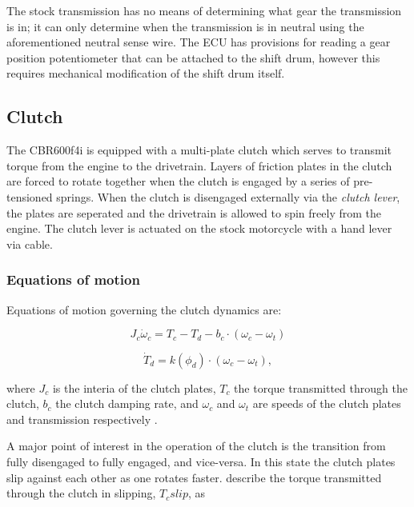 The stock transmission has no means of determining what gear the transmission is in; it can only determine when the transmission is in neutral using the aforementioned neutral sense wire. The ECU has provisions for reading a gear position potentiometer that can be attached to the shift drum, however this requires mechanical modification of the shift drum itself.

\subsection{Clutch}

The CBR600f4i is equipped with a multi-plate clutch which serves to transmit torque from the engine to the drivetrain. Layers of friction plates in the clutch are forced to rotate together when the clutch is engaged by a series of pre-tensioned springs. When the clutch is disengaged externally via the \emph{clutch lever}, the plates are seperated and the drivetrain is allowed to spin freely from the engine. The clutch lever is actuated on the stock motorcycle with a hand lever via cable.

\subsubsection{Equations of motion}

Equations of motion governing the clutch dynamics are:

\begin{equation}\label{eq:clutch_dynamics_a}
  J_c\dot{\omega}_c=T_c-T_d-b_c\cdot\left(\omega_c-\omega_t\right)
\end{equation}

\begin{equation}\label{eq:clutch_dynamics_b}
  \dot{T}_d=k\left(\phi_d\right)\cdot\left(\omega_c-\omega_t\right),
\end{equation}

where $J_c$ is the interia of the clutch plates, $T_c$ the torque transmitted through the clutch, $b_c$ the clutch damping rate, and $\omega_c$ and $\omega_t$ are speeds of the clutch plates and transmission respectively \cite{clutch_control}.

A major point of interest in the operation of the clutch is the transition from fully disengaged to fully engaged, and vice-versa. In this state the clutch plates slip against each other as one rotates faster.  describe the torque transmitted through the clutch in slipping, $T_c{slip}$, as


